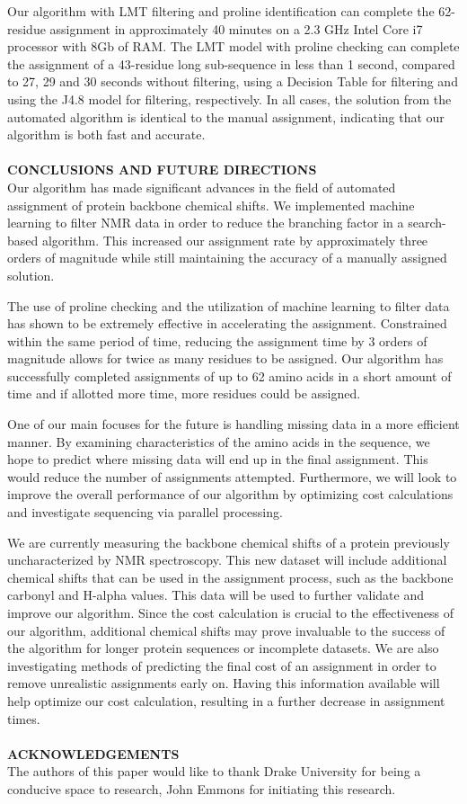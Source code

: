 \documentclass{article}
\begin{document}
Our algorithm with LMT filtering and proline identification can complete the 62-residue assignment in approximately 40 minutes on a 2.3 GHz Intel Core i7 processor with 8Gb of RAM. The LMT model with proline checking can complete the assignment of a 43-residue long sub-sequence in less than 1 second, compared to 27, 29 and 30 seconds without filtering, using a Decision Table for filtering and using the J4.8 model for filtering, respectively. In all cases, the solution from the automated algorithm is identical to the manual assignment, indicating that our algorithm is both fast and accurate. 
\\\\
\noindent\textbf {CONCLUSIONS AND FUTURE DIRECTIONS}\\
Our algorithm has made significant advances in the field of automated assignment of protein backbone chemical shifts. We implemented machine learning to filter NMR data in order to reduce the branching factor in a search-based algorithm. This increased our assignment rate by approximately three orders of magnitude while still maintaining the accuracy of a manually assigned solution.

The use of proline checking and the utilization of machine learning to filter data has shown to be extremely effective in accelerating the assignment. Constrained within the same period of time, reducing the assignment time by 3 orders of magnitude allows for twice as many residues to be assigned. Our algorithm has successfully completed assignments of up to 62 amino acids in a short amount of time and if allotted more time, more residues could be assigned.

One of our main focuses for the future is handling missing data in a more efficient manner. By examining characteristics of the amino acids in the sequence, we hope to predict where missing data will end up in the final assignment. This would reduce the number of assignments attempted. Furthermore, we will look to improve the overall performance of our algorithm by optimizing cost calculations and investigate sequencing via parallel processing.

We are currently measuring the backbone chemical shifts of a protein previously uncharacterized by NMR spectroscopy. This new dataset will include additional chemical shifts that can be used in the assignment process, such as the backbone carbonyl and H-alpha values. This data will be used to further validate and improve our algorithm. Since the cost calculation is crucial to the effectiveness of our algorithm, additional chemical shifts may prove invaluable to the success of the algorithm for longer protein sequences or incomplete datasets. We are also investigating methods of predicting the final cost of an assignment in order to remove unrealistic assignments early on. Having this information available will help optimize our cost calculation, resulting in a further decrease in assignment times. 
\\\\
\textbf{ACKNOWLEDGEMENTS}
\\
The authors of this paper would like to thank Drake University for being a conducive space to research, John Emmons for initiating this research.
\end{document}

